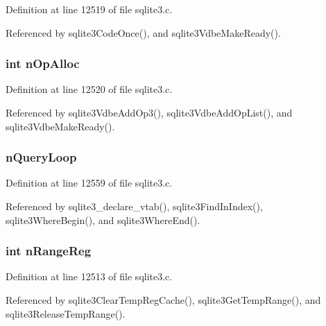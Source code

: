 Definition at line 12519 of file sqlite3.\+c.



Referenced by sqlite3\+Code\+Once(), and sqlite3\+Vdbe\+Make\+Ready().

\hypertarget{struct_parse_aefbb8e03fd662e3f265fd1500454c7b0}{}
\subsubsection[{n\+Op\+Alloc}]{\setlength{\rightskip}{0pt plus 5cm}int n\+Op\+Alloc}\label{struct_parse_aefbb8e03fd662e3f265fd1500454c7b0}


Definition at line 12520 of file sqlite3.\+c.



Referenced by sqlite3\+Vdbe\+Add\+Op3(), sqlite3\+Vdbe\+Add\+Op\+List(), and sqlite3\+Vdbe\+Make\+Ready().

\hypertarget{struct_parse_ad94b55c666d5c00f9be8f0245af57bad}{}
\subsubsection[{n\+Query\+Loop}]{ n\+Query\+Loop}\label{struct_parse_ad94b55c666d5c00f9be8f0245af57bad}


Definition at line 12559 of file sqlite3.\+c.



Referenced by sqlite3\+\_\+declare\+\_\+vtab(), sqlite3\+Find\+In\+Index(), sqlite3\+Where\+Begin(), and sqlite3\+Where\+End().

\hypertarget{struct_parse_a01a7e2c048df6599804b75acab426ef0}{}
\subsubsection[{n\+Range\+Reg}]{\setlength{\rightskip}{0pt plus 5cm}int n\+Range\+Reg}\label{struct_parse_a01a7e2c048df6599804b75acab426ef0}


Definition at line 12513 of file sqlite3.\+c.



Referenced by sqlite3\+Clear\+Temp\+Reg\+Cache(), sqlite3\+Get\+Temp\+Range(), and sqlite3\+Release\+Temp\+Range().

